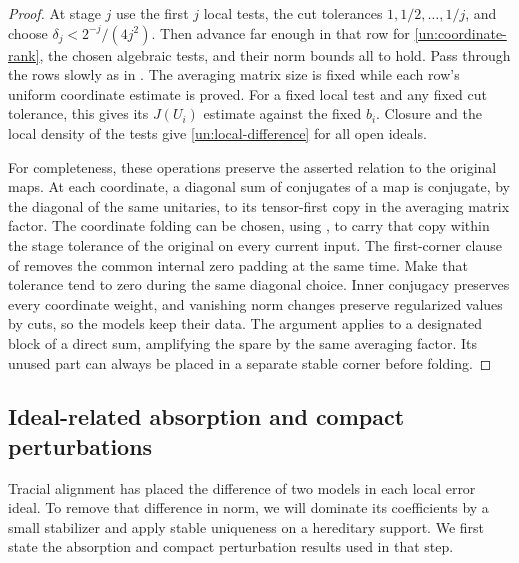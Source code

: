 \begin{proof}
At stage $j$ use the first $j$ local tests, the cut tolerances
$1,1/2,\ldots,1/j$, and choose
$\delta_j<2^{-j}/(4j^2)$.  Then advance far enough in that row for
\eqref{un:coordinate-rank}, the chosen algebraic tests, and their
norm bounds all to hold.  Pass through the rows slowly as in
.  The averaging matrix size is fixed while
each row's uniform coordinate estimate is proved.  For a fixed local
test and any fixed cut
tolerance, this gives its $J(U_i)$ estimate against the fixed $b_i$.
Closure and the local density of the tests give
\eqref{un:local-difference} for all open ideals.

For completeness, these operations preserve the asserted relation
to the original maps.  At each coordinate, a diagonal sum of
conjugates of a map is conjugate, by the diagonal of the same
unitaries, to its tensor-first copy in the averaging matrix factor.
The coordinate folding can be chosen, using , to
carry that copy within the stage tolerance of the original on every
current input.  The first-corner clause of  removes
the common internal zero padding at the same time.  Make that tolerance tend to zero during the same
diagonal choice.  Inner conjugacy preserves every coordinate weight,
and vanishing norm changes preserve regularized values by cuts, so
the models keep their data.  The argument applies to a designated
block of a direct sum, amplifying the spare by the same averaging
factor.  Its unused part can always be placed in a separate stable
corner before folding.
\end{proof}

\subsection{Ideal-related absorption and compact perturbations}

Tracial alignment has placed the difference of two models in each
local error ideal. To remove that difference in norm, we will dominate
its coefficients by a small stabilizer and apply stable uniqueness
on a hereditary support. We first state the absorption and compact
perturbation results used in that step.

